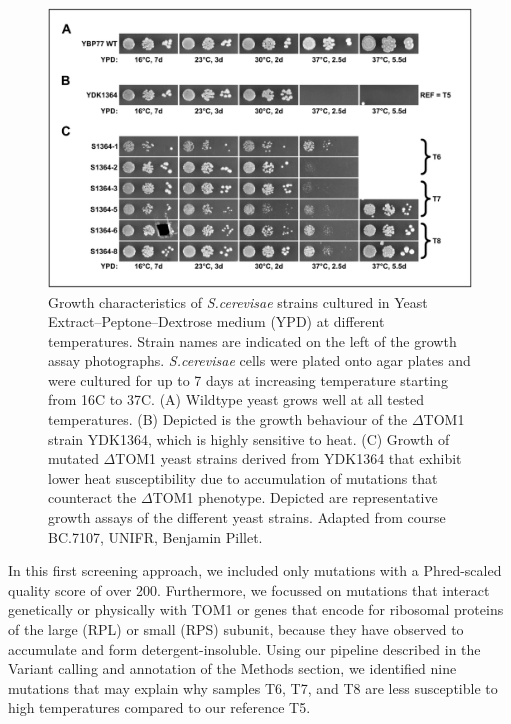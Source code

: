 \documentclass[10pt,a4paper]{article}
\begin{document}
\begin{figure}[h]
	\centering
	\includegraphics[width=0.7\linewidth]{img/yeastgrowth}
	\caption{\small Growth characteristics of \textit{S.cerevisae} strains cultured in Yeast Extract–Peptone–Dextrose medium (YPD) at different temperatures. Strain names are indicated on the left of the growth assay photographs. \textit{S.cerevisae} cells were plated onto agar plates and were cultured for up to 7 days at increasing temperature starting from 16\degree C to 37\degree C. (A) Wildtype yeast grows well at all tested temperatures. (B) Depicted is the growth behaviour of the $\Delta$TOM1 strain YDK1364, which is highly sensitive to heat. (C) Growth of mutated $\Delta$TOM1 yeast strains derived from YDK1364 that exhibit lower heat susceptibility due to accumulation of mutations that counteract the $\Delta$TOM1 phenotype. Depicted are representative growth assays of the different yeast strains. Adapted from course BC.7107, UNIFR, Benjamin Pillet.}
	\label{fig:yeastgrowth}
\end{figure}


\noindent In this first screening approach, we included only mutations with a Phred-scaled quality score of over 200. Furthermore, we focussed on mutations that interact genetically or physically with TOM1 or genes that encode for ribosomal proteins of the large (RPL) or small (RPS) subunit, because they have observed to accumulate and form detergent-insoluble. Using our pipeline described in the Variant calling and annotation of the Methods section, we identified nine mutations that may explain why samples T6, T7, and T8 are less susceptible to high temperatures compared to our reference T5.
\end{document}
